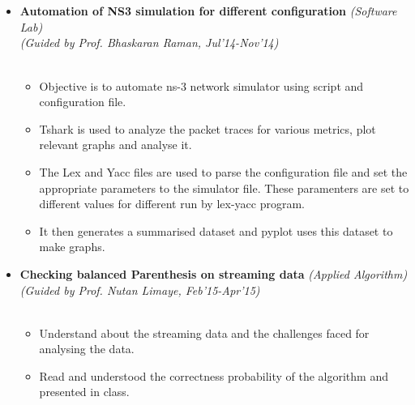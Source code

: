 \\[-0.7cm]\\
\begin{itemize}
	\item \textbf{Automation of NS3 simulation for different configuration} \hfill \emph{(Software Lab)} \\
	\emph{(Guided by Prof. Bhaskaran Raman, Jul'14-Nov'14)} \hfill \\[-1cm]\\ 
\begin{itemize}
\item Objective is to automate ns-3  network  simulator using script and configuration file.  
\item Tshark is used to analyze the packet traces for various metrics, plot relevant graphs and analyse it.
\item The Lex and Yacc files are used to parse the configuration file and set the appropriate parameters to the simulator file. These paramenters are set to different values for different run by lex-yacc program. 
\item It then generates a summarised dataset and pyplot uses this dataset to make graphs.
\end{itemize}
\item \textbf{Checking balanced Parenthesis on streaming data} \hfill \emph{(Applied Algorithm)} \\
	\emph{(Guided by Prof. Nutan Limaye, Feb'15-Apr'15)} \hfill \\[-1cm]\\ 
\begin{itemize}
\item Understand about the streaming data and the challenges faced for analysing the data.
\item Read and understood the correctness probability of the algorithm and presented in class.
\end{itemize}
\end{itemize}
